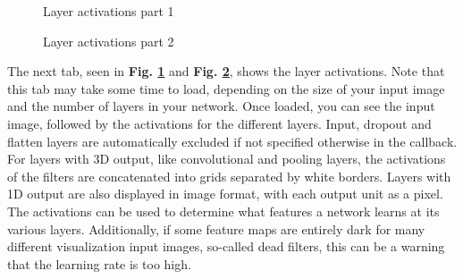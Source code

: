 
\begin{figure}[h!]
    \centering
        \caption{Layer activations part 1}
        \label{layeract-tab1}
\end{figure}

\begin{figure}[h!]
    \centering
        \caption{Layer activations part 2}
        \label{layeract-tab2}
\end{figure}

\noindent The next tab, seen in \textbf{Fig. \ref{layeract-tab1}} and \textbf{Fig. \ref{layeract-tab2}}, shows the layer activations. Note that this tab may take some time to load, depending on the size of your input image and the number of layers in your network. Once loaded, you can see the input image, followed by the activations for the different layers. Input, dropout and flatten layers are automatically excluded if not specified otherwise in the callback. For layers with 3D output, like convolutional and pooling layers, the activations of the filters are concatenated into grids separated by white borders. Layers with 1D output are also displayed in image format, with each output unit as a pixel. The activations can be used to determine what features a network learns at its various layers. Additionally, if some feature maps are entirely dark for many different visualization input images, so-called dead filters, this can be a warning that the learning rate is too high. \\

